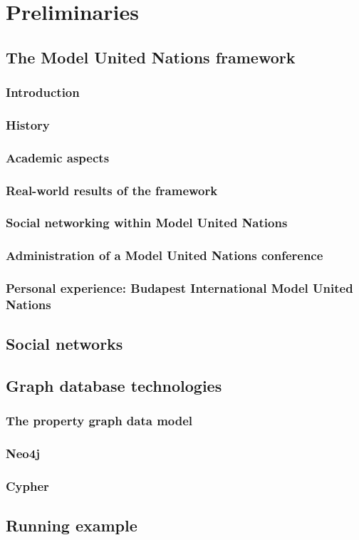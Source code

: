 \chapter{Preliminaries}
\label{chapter:preliminaries}

\section{The Model United Nations framework}
\label{section:munframework}

\subsection{Introduction}
\subsection{History}
\subsection{Academic aspects}
\subsection{Real-world results of the framework}
\subsection{Social networking within Model United Nations}
\subsection{Administration of a Model United Nations conference}
\subsection{Personal experience: Budapest International Model United Nations}

\section{Social networks}

\section{Graph database technologies}
\subsection{The property graph data model}
\subsection{Neo4j}
\subsection{Cypher}

\section{Running example}
